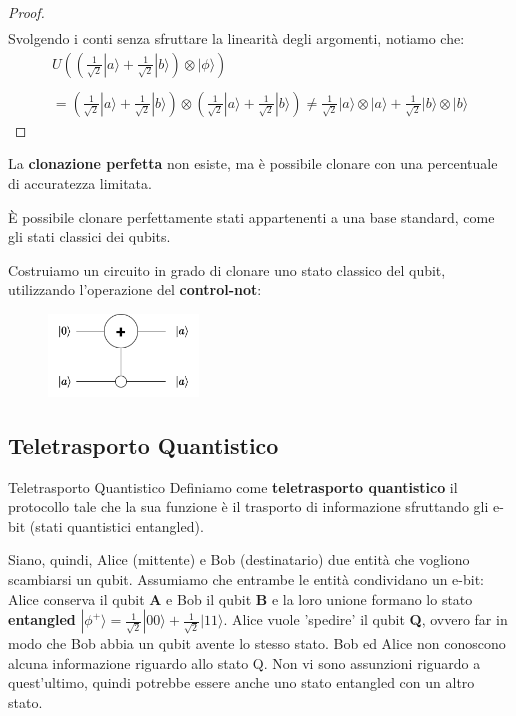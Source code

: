 \begin{proof}
\begin{equation*}
\begin{array}{c}
        \end{array}
    \end{equation*}
    Svolgendo i conti senza sfruttare la linearità degli argomenti, notiamo che:
    \begin{equation*}
        \begin{array}{c}
            U\left(\left(\frac{1}{\sqrt{2}}|a\rangle + \frac{1}{\sqrt{2}}|b\rangle\right) \otimes |\phi\rangle \right) \\ \\
            = \left(\frac{1}{\sqrt{2}}|a\rangle + \frac{1}{\sqrt{2}}|b\rangle\right) \otimes \left(\frac{1}{\sqrt{2}}|a\rangle + \frac{1}{\sqrt{2}}|b\rangle\right) \not = \frac{1}{\sqrt{2}}|a\rangle \otimes |a\rangle + \frac{1}{\sqrt{2}}|b\rangle \otimes |b\rangle
        \end{array}
    \end{equation*}
\end{proof}
\begin{oss}{}{}
    La \textbf{clonazione perfetta} non esiste, ma è possibile clonare con una percentuale di accuratezza
    limitata.
\end{oss}
\begin{oss}{}{}
    È possibile clonare perfettamente stati appartenenti a una base standard, come gli stati classici dei qubits.
\end{oss}

Costruiamo un circuito in grado di clonare uno stato classico del qubit, utilizzando l'operazione del
\textbf{control-not}:
\begin{figure}[h]
        \centering
        \includegraphics[width = 4cm]{./Images/example.png}
        \caption{}
\end{figure}

\subsection{Teletrasporto Quantistico}
\begin{definition}{Teletrasporto Quantistico}{}
    Definiamo come \textbf{teletrasporto quantistico} il protocollo tale che la sua funzione è il trasporto
    di informazione sfruttando gli e-bit (stati quantistici entangled).
\end{definition}
Siano, quindi, Alice (mittente) e Bob (destinatario) due entità che vogliono scambiarsi un qubit. Assumiamo
che entrambe le entità condividano un e-bit: Alice conserva il qubit \textbf{A} e Bob il qubit \textbf{B} e la
loro unione formano lo stato \textbf{entangled} $|\phi^+\rangle = \frac{1}{\sqrt{2}}|00\rangle + \frac{1}{\sqrt{2}}|11\rangle$.
Alice vuole 'spedire' il qubit \textbf{Q}, ovvero far in modo che Bob abbia un qubit avente lo stesso stato. 
Bob ed Alice non conoscono alcuna informazione riguardo allo stato Q. Non vi sono
assunzioni riguardo a quest'ultimo, quindi potrebbe essere anche uno stato entangled con un altro stato.


